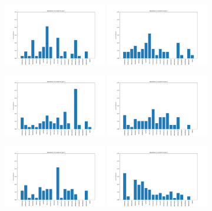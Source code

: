 \documentclass[a4paper,12pt]{article}
\begin{document}
\begin{figure}[!h]
    \centering

    \includegraphics[width=0.4\textwidth]{Clustering/number_poke_gen/gen1.png}
    \includegraphics[width=0.4\textwidth]{Clustering/number_poke_gen/gen2.png}
    

    \vspace{1em}  %

    \includegraphics[width=0.4\textwidth]{Clustering/number_poke_gen/gen3.png}
    \includegraphics[width=0.4\textwidth]{Clustering/number_poke_gen/gen4.png}
    

    \vspace{1em}  %

    \includegraphics[width=0.4\textwidth]{Clustering/number_poke_gen/gen5.png}
    \includegraphics[width=0.4\textwidth]{Clustering/number_poke_gen/gen6.png}
    


\end{figure}
\end{document}
